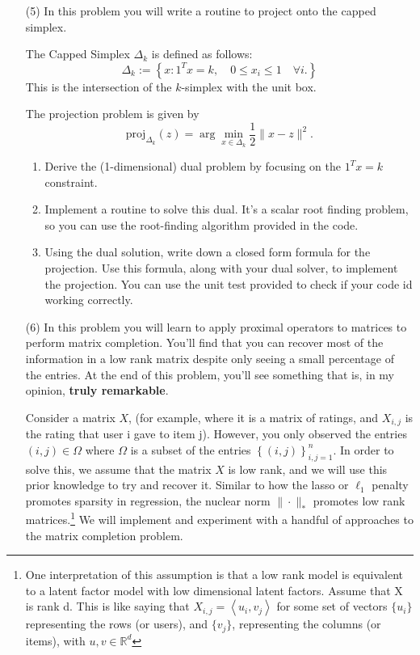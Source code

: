 \documentclass[11pt]{amsart}
\begin{document}
\vskip 16pt
\begin{enumerate}
\item[(5)] In this problem you will write a routine to project onto the capped simplex. 

The Capped Simplex $\Delta_k$ is defined as follows: 
\[
\Delta_k := \left\{x: 1^Tx = k, \quad 0 \leq x_i \leq 1 \quad \forall i. \right\}
\]
This is the intersection of the $k$-simplex with the unit box. 

The projection problem is given by 
\[
\mbox{proj}_{\Delta_k}(z) = \arg\min_{x \in \Delta_k} \frac{1}{2}\|x-z\|^2.
\]
\begin{enumerate}
\item Derive the (1-dimensional) dual problem by focusing on the $1^Tx = k$ constraint. 
\bigskip \bigskip
\item Implement a routine to solve this dual. It's a scalar root finding problem, 
so you can use the root-finding algorithm provided in the code.  
\bigskip \bigskip
\item Using the dual solution, write down a closed form formula for the projection.  
Use this formula, along with your dual solver, to implement the projection. You can use the unit test 
provided to check if your code id working correctly. 

\end{enumerate}

\item[(6)] In this problem you will learn to apply proximal operators to matrices to perform matrix completion. You'll find that you can recover most of the information in a low rank matrix despite only seeing a small percentage of the entries. At the end of this problem, you'll see something that is, in my opinion, \textbf{truly remarkable}. 

Consider a matrix $X$, (for example, where it is a matrix of ratings, and $X_{i,j}$ is the rating that user i gave to item j). However, you only observed the entries $(i,j)\in \Omega$ where $\Omega$ is a subset of the entries $\left\{(i,j) \right\}_{i,j=1}^n$. In order to solve this, we assume that the matrix $X$ is low rank, and we will use this prior knowledge to try and recover it. Similar to how the lasso or $\ell_1$ penalty promotes sparsity in regression, the nuclear norm $\| \cdot \|_*$ promotes low rank matrices.\footnote{One interpretation of this assumption is that a low rank model is equivalent to a latent factor model with low dimensional latent factors. Assume that X is rank d. This is like saying that $X_{i,j}=\left<u_i,v_j\right>$ for some set of vectors $\{u_i\}$ representing the rows (or users), and $\{v_j\}$, representing the columns (or items), with $u,v\in \mathbb{R}^d$} We will implement and experiment with a handful of approaches to the matrix completion problem. 


\end{enumerate}
\end{document}
